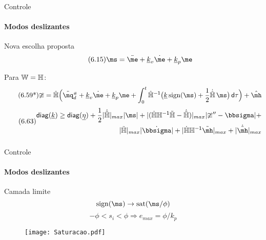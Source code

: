 \documentclass[25pt,landscape]{beamer}
\begin{document}
\begin{frame}{Controle}
    \framesubtitle{Modos deslizantes}
    \begin{block}{Nova escolha proposta}
    	\begin{equation} \tag{6.15} 
			\ms = \ddot{\me} + \underline{k}_v \dot{\me} + \underline{k}_p \me
		\end{equation} 

		Para $\mathbb{W} = \mathbb{H}$:
		\begin{equation} \tag{6.59*}
			\mup = \hat{\mH} \Big(\ddot{\mq}\ssh_d + \underline{k}_v \dot{\me} + \underline{k}_p \me + \int_{0}^t \hat{\mH}^\msI \big( \underline{k} \sign(\ms) +  \frac{1}{2}\dot{\hat{\mH}} \, \ms \big) \, \dd \tau \Big) + \hat{\mh}
		\end{equation}
		\pause
		\begin{equation} \label{eq:DesigualdadeK2_b2} \tag{6.63}
		\begin{split}
			\diag(\underline{k})  \geq \diag(\underline{\eta}) + \frac{1}{2}|\dot{\tilde{\mH}}|_{max} |\ms| + |( \dot{\mH} \mH^\msI \tilde{\mH} -\dot{\tilde{\mH}})|_{max} 	|\mup'' - \msigma |  + \\
			|\tilde{\mH}|_{max} |\dot{\msigma}| + |\dot{\mH} \mH^\msI \tilde{\mh}|_{max} + |\dot{\tilde{\mh}}|_{max}
		\end{split}			
		\end{equation}
		$$ $$
    \end{block}
\end{frame}

\begin{frame}{Controle}
    \framesubtitle{Modos deslizantes}
    \begin{block}{Camada limite}
    	\begin{equation*}
    		\sign(\ms) \rightarrow \sat(\ms/\phi)
    	\end{equation*}
    	\begin{equation*}
    		-\phi < s_i < \phi \Rightarrow e_{max} = \phi/k_p
    	\end{equation*}
    \end{block}
    \begin{figure}[!h]
        \centering
        \texttt{[image: Saturacao.pdf]}
    \end{figure}  
\end{frame}
\end{document}
